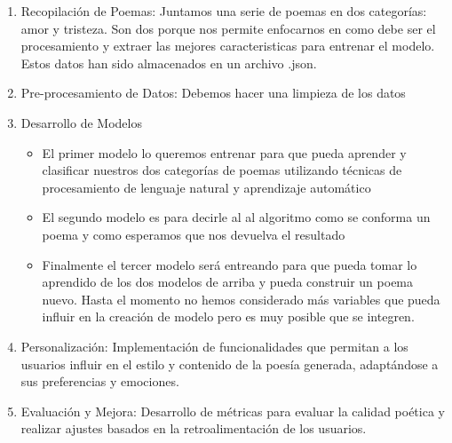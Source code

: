 \begin{enumerate}
    \item Recopilación de Poemas: Juntamos una serie de poemas en dos categorías: amor y tristeza. 
    Son dos porque nos permite enfocarnos en como debe ser el procesamiento y extraer las mejores
    caracteristicas para entrenar el modelo. Estos datos han sido almacenados en un archivo .json. 
    
    \item Pre-procesamiento de Datos: Debemos hacer una limpieza de los datos
    
    \item Desarrollo de Modelos
    
    \begin{itemize}
        \item El primer modelo lo queremos entrenar para que pueda aprender 
        y clasificar nuestros dos categorías de poemas utilizando técnicas de procesamiento de 
        lenguaje natural y aprendizaje automático

        \item El segundo modelo es para decirle al al algoritmo como se conforma un poema y como 
        esperamos que nos devuelva el resultado

        \item Finalmente el tercer modelo será entreando para que pueda tomar lo aprendido de los
        dos modelos de arriba y pueda construir un poema nuevo. Hasta el momento no hemos considerado
        más variables que pueda influir en la creación de modelo pero es muy posible que se integren.
    \end{itemize}
    
    \item Personalización: Implementación de funcionalidades que permitan a los usuarios influir 
    en el estilo y contenido de la poesía generada, adaptándose a sus preferencias y emociones.

    \item Evaluación y Mejora: Desarrollo de métricas para evaluar la calidad poética y realizar ajustes 
    basados en la retroalimentación de los usuarios.
\end{enumerate}